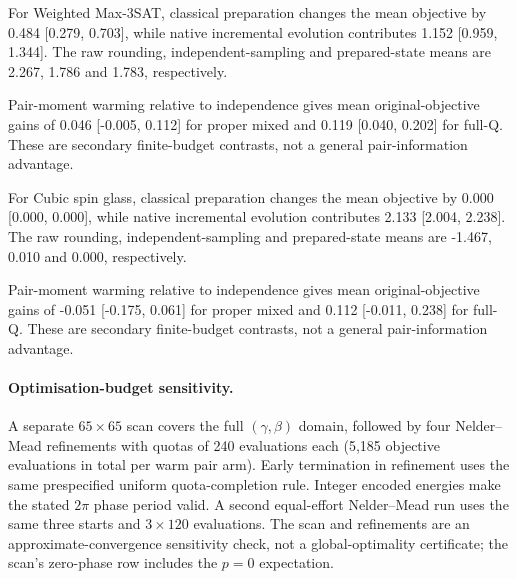 \documentclass[a4paper,onecolumn,11pt,unpublished]{quantumarticle}
\theoremstyle{remark}
\begin{document}
For Weighted Max-3SAT, classical preparation changes the mean objective by 0.484 [0.279, 0.703], while native incremental evolution contributes 1.152 [0.959, 1.344]. The raw rounding, independent-sampling and prepared-state means are 2.267, 1.786 and 1.783, respectively.

Pair-moment warming relative to independence gives mean original-objective gains of 0.046 [-0.005, 0.112] for proper mixed and 0.119 [0.040, 0.202] for full-Q. These are secondary finite-budget contrasts, not a general pair-information advantage.

For Cubic spin glass, classical preparation changes the mean objective by 0.000 [0.000, 0.000], while native incremental evolution contributes 2.133 [2.004, 2.238]. The raw rounding, independent-sampling and prepared-state means are -1.467, 0.010 and 0.000, respectively.

Pair-moment warming relative to independence gives mean original-objective gains of -0.051 [-0.175, 0.061] for proper mixed and 0.112 [-0.011, 0.238] for full-Q. These are secondary finite-budget contrasts, not a general pair-information advantage.

\paragraph{Optimisation-budget sensitivity.} A separate $65\times65$ scan covers the full $(\gamma,\beta)$ domain, followed by four Nelder--Mead refinements with quotas of 240 evaluations each (5,185 objective evaluations in total per warm pair arm). Early termination in refinement uses the same prespecified uniform quota-completion rule. Integer encoded energies make the stated $2\pi$ phase period valid. A second equal-effort Nelder--Mead run uses the same three starts and $3\times120$ evaluations. The scan and refinements are an approximate-convergence sensitivity check, not a global-optimality certificate; the scan's zero-phase row includes the $p=0$ expectation.
\end{document}
